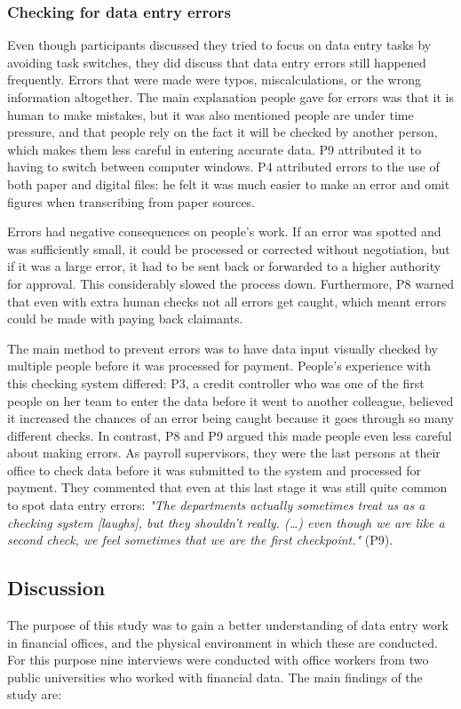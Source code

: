 \subsubsection{Checking for data entry errors}
Even though participants discussed they tried to focus on data entry tasks by avoiding task switches, they did discuss that data entry errors still happened frequently. Errors that were made were typos, miscalculations, or the wrong information altogether. The main explanation people gave for errors was that it is human to make mistakes, but it was also mentioned people are under time pressure, and that people rely on the fact it will be checked by another person, which makes them less careful in entering accurate data. P9 attributed it to having to switch between computer windows. P4 attributed errors to the use of both paper and digital files: he felt it was much easier to make an error and omit figures when transcribing from paper sources.

Errors had negative consequences on people's work. If an error was spotted and was sufficiently small, it could be processed or corrected without negotiation, but if it was a large error, it had to be sent back or forwarded to a higher authority for approval. This considerably slowed the process down. Furthermore, P8 warned that even with extra human checks not all errors get caught, which meant errors could be made with paying back claimants.

The main method to prevent errors was to have data input visually checked by multiple people before it was processed for payment. People's experience with this checking system differed: P3, a credit controller who was one of the first people on her team to enter the data before it went to another colleague, believed it increased the chances of an error being caught because it goes through so many different checks. In contrast, P8 and P9 argued this made people even less careful about making errors. As payroll supervisors, they were the last persons at their office to check data before it was submitted to the system and processed for payment. They commented that even at this last stage it was still quite common to spot data entry errors: \textit{"The departments actually sometimes treat us as a checking system [laughs], but they shouldn't really. (…) even though we are like a second check, we feel sometimes that we are the first checkpoint."} (P9).

\subsection{Discussion}
The purpose of this study was to gain a better understanding of data entry work in financial offices, and the physical environment in which these are conducted. For this purpose nine interviews were conducted with office workers from two public universities who worked with financial data. The main findings of the study are: 


